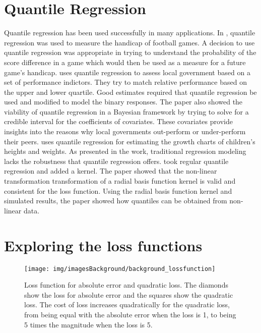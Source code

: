 \section{Quantile Regression}
Quantile regression has been used successfully in many applications. In \citet{Bassett07}, quantile regression was used to measure the handicap of football games. A decision to use quantile regression was appropriate in trying to understand the probability of the score difference in a game which would then be used as a measure for a future game's handicap. \citet{Hewson08} uses quantile regression to assess local government based on a set of performance indictors. They try to match relative performance based on the upper and lower quartile. Good estimates required that quantile regression be used and modified to model the binary responses. The paper also showed the viability of quantile regression in a Bayesian framework by trying to solve for a credible interval for the coefficients of covariates. These covariates provide insights into the reasons why local governments out-perform or under-perform their peers. \citet{Wei06} uses quantile regression for estimating the growth charts of children's heights and weights. As presented in the work, traditional regression modeling lacks the robustness that quantile regression offers. \citet{Christmann08} took regular quantile regression and added a kernel.  The paper showed that the non-linear transformation transformation of a radial basis function kernel is valid and consistent for the loss function. Using the radial basis function kernel and simulated results, the paper showed how quantiles can be obtained from non-linear data. 

\section{Exploring the loss functions}
\begin{figure}
 \centering
\texttt{[image: img/imagesBackground/background\_lossfunction]}\\
 \caption{Loss function for absolute error and quadratic loss. The diamonds show the loss for absolute error and the squares show the quadratic loss. The cost of loss increases quadratically for the quadratic loss, from being equal with the absolute error when the loss is 1, to being 5 times the magnitude when the loss is 5.}
 \label{Fig:L1L2Loss}
\end{figure}

